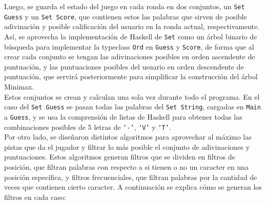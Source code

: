 \documentclass[11pt]{article}
\begin{document}
Luego, se guarda el estado del juego en cada ronda en dos conjuntos, un
\texttt{Set Guess} y un \texttt{Set Score}, que contienen estos las palabras que
sirven de posible adivinación y posible calificación del usuario en la ronda actual,
respectivamente. Así, se aprovecha la implementación de Haskell de \texttt{Set} como
un árbol binario de búsqueda para implementar la typeclass \texttt{Ord} en \texttt{Guess} y \texttt{Score}, de forma que al crear cada conjunto se tengan las
adivinaciones posibles en orden ascendente de puntuación, y las puntuaciones posibles
del usuario en orden descendente de puntuación, que servirá posteriormente para
simplificar la construcción del árbol Minimax. \\

Estos conjuntos se crean y calculan una sola vez durante todo el programa. En el caso
del \texttt{Set Guess} se pasan todas las palabras del \texttt{Set String}, cargadas en
\texttt{Main} a \texttt{Guess}, y se usa la comprensión de listas de Haskell para
obtener todas las combinaciones posibles de 5 letras de \texttt{`-'}, \texttt{`V'} y
\texttt{`T'}. \\

Por otro lado, se diseñaron distintos algoritmos para aprovechar al máximo las pistas
que da el jugador y filtrar lo más posible el conjunto de adivinaciones y puntuaciones.
Estos algoritmos generan filtros que se dividen en filtros de posición, que filtran
palabras con respecto a si tienen o no un caracter en una posición específica, y filtros
frecuenciales, que filtran palabras por la cantidad de veces que contienen cierto
caracter. A continuación se explica cómo se generan los filtros en cada caso: \\
\end{document}
